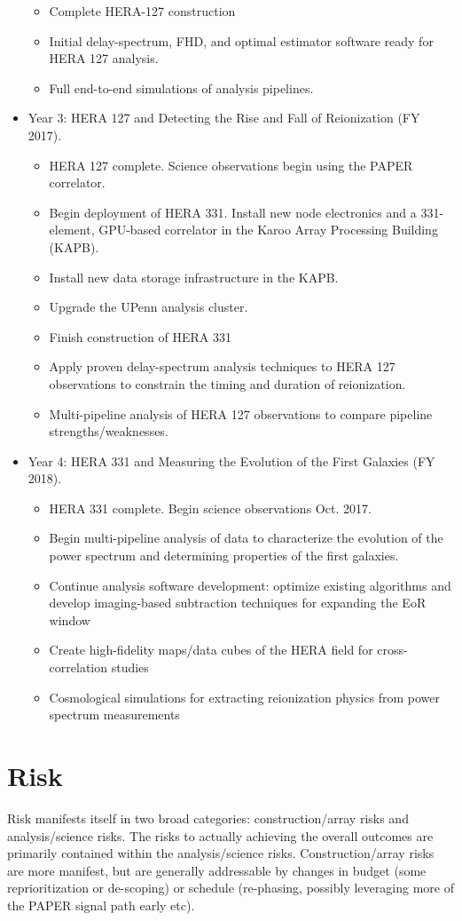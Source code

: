 \documentclass[preprint]{aastex}
\begin{document}
\begin{itemize}[itemsep=-4pt,parsep=-3pt]
\begin{itemize}[itemsep=-4pt]
\item Complete HERA-127 construction
\item Initial delay-spectrum, FHD, and optimal estimator software ready for HERA 127 analysis.
\item Full end-to-end simulations of analysis pipelines.
\end{itemize}
\item Year 3:  HERA 127 and Detecting the Rise and Fall of Reionization (FY 2017). 
\begin{itemize}[itemsep=-4pt]
\item HERA 127 complete. Science observations begin using the PAPER correlator. 
\item Begin deployment of HERA 331. Install new node electronics and a 331-element, GPU-based correlator in the Karoo Array Processing Building (KAPB). 
\item Install new data storage infrastructure in the KAPB. 
\item Upgrade the UPenn analysis cluster. 
\item Finish construction of HERA 331
\item Apply proven delay-spectrum analysis techniques to HERA 127 observations to constrain the timing and duration of reionization. 
\item Multi-pipeline analysis of HERA 127 observations to compare pipeline strengths/weaknesses.
\end{itemize}
\item Year 4:  HERA 331 and Measuring the Evolution of the First Galaxies (FY 2018). 
\begin{itemize}[itemsep=-4pt]
\item HERA 331 complete. Begin science observations Oct. 2017. 
\item Begin multi-pipeline analysis of data to characterize the evolution of the power spectrum and determining properties of the first galaxies. 
\item Continue analysis software development: optimize existing algorithms and develop imaging-based subtraction techniques for expanding the EoR window
\item Create high-fidelity maps/data cubes of the HERA field for cross-correlation studies
\item Cosmological simulations for extracting reionization physics from power spectrum measurements
\end{itemize}
\end{itemize}

\section{Risk}
\label{sec:risk}
Risk manifests itself in two broad categories: construction/array risks and
analysis/science risks. The risks to actually achieving the overall outcomes are
primarily contained within the analysis/science risks. Construction/array risks are
more manifest, but are generally addressable by changes in budget (some
reprioritization or de-scoping) or schedule (re-phasing, possibly leveraging more of
the PAPER signal path early etc).
\end{document}
